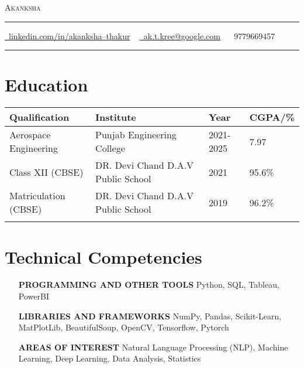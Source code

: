 \documentclass[letterpaper,10pt]{article}
\newcommand{\documentTitle}[2]{
  \begin{center}
    {\Huge\scshape\color{accentTitle} #1}
    \vspace{10pt}
    {\color{accentLine} \hrule}
    \vspace{2pt}
    \footnotesize{#2}
    \vspace{2pt}
    {\color{accentLine} \hrule}
  \end{center}
}
\begin{document}

  \documentTitle{Akanksha}{
    \href{https://www.linkedin.com/in/akanksha--thakur/}{\raisebox{-0.15\height} \faLinkedin\ linkedin.com/in/akanksha--thakur} ~
    \href{mailto:ak.t.kree@google.com}{\raisebox{-0.15\height} \faEnvelope\ ak.t.kree@google.com} ~
    \raisebox{-0.05\height} \faPhone\ 9779669457
  }
  


  \section{Education}

  \setlength{\tabcolsep}{15pt} %
  \begin{tabular}{llll}
    \centering
    \toprule
    \textbf{Qualification}  & \textbf{Institute}    & \textbf{Year}     & \textbf{CGPA/\%} \\ 
    \toprule
    Aerospace Engineering & Punjab Engineering College  & 2021-2025   & 7.97\\ 
    Class XII (CBSE) & DR. Devi Chand D.A.V Public School  & 2021   & 95.6\%    \\ 
    Matriculation (CBSE) & DR. Devi Chand D.A.V Public School  & 2019   & 96.2\%   \\
    \bottomrule \\[-0.75cm]
  \end{tabular}
  \vspace{8pt}



  \section{Technical Competencies}

  \begin{itemize}[itemsep=-2px, parsep=1pt, leftmargin=185pt]
    \item[\textbf{PROGRAMMING AND OTHER TOOLS}] Python, SQL, Tableau, PowerBI
    \item[\textbf{LIBRARIES AND FRAMEWORKS}] NumPy, Pandas, Scikit-Learn, MatPlotLib, BeautifulSoup, OpenCV, Tensorflow, Pytorch
    \item[\textbf{AREAS OF INTEREST}] Natural Language Processing (NLP),
    Machine Learning, Deep Learning, Data Analysis, Statistics
  \end{itemize}
\end{document}
